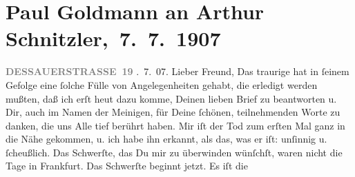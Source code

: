 

         
         \renewcommand{\erwaehntePersonen}{Personen: Paul Goldmann, Clementine Goldmann, Fedor Mamroth, Olga Schnitzler}
         \renewcommand{\erwaehnteOrte}{Orte: Berlin, Dessauer Straße, Frankfurt am Main, Marienbad, Wien}
         \renewcommand{\erwaehnteWerke}{}
               \section[ Paul Goldmann an Arthur Schnitzler, 7. 7. 1907]{ Paul Goldmann an Arthur Schnitzler, 7. 7. 1907}\nopagebreak{}\rehead{ }\begin{ledgroupsized}[t]{13cm}\normalsize\beginnumbering{} \toendnotes[C]{\smallbreak\pagebreak[2]} 
\toendnotes[C]{\smallbreak}\pstart
           \noindent{}\raggedleft{}{\pb}\textcolor{gray}{\textbf{DESSAUERSTRASSE 19}}\pend
           . 7. 07.\pend
           \pstart{}Lieber Freund,\pend\pstart
           Das traurige \label{K_L03254-1v}\label{K_L03254-1h} hat in
               ſeinem Gefolge eine ſolche Fülle von Angelegenheiten gehabt, die erledigt werden
               mußten, daß ich erſt heut dazu komme, Deinen lieben
               Brief zu beantworten u. Dir, auch im Namen der Meinigen, für Deine ſchönen,
               teilnehmenden Worte zu danken, die uns Alle tief berührt haben.\pend
           \pstart
           Mir iſt der Tod zum erſten Mal ganz in die Nähe gekommen, {\pb}u. ich habe ihn erkannt, als das, was er iſt:
               unſinnig u. ſcheußlich.\pend
           \pstart
           Das Schwerſte, das Du mir zu überwinden wünſchſt, waren nicht die Tage in Frankfurt. Das Schwerſte beginnt jetzt. Es iſt die

\end{ledgroupsized}
